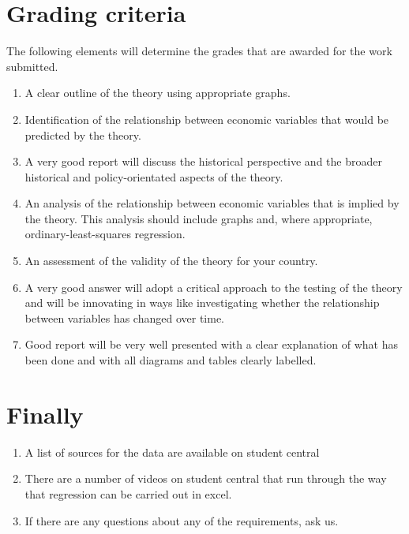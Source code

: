 \documentclass[12pt, a4paper, oneside]{article}\usepackage{graphicx, color}
\begin{document}
\section*{Grading criteria}
The following elements will determine the grades that are awarded for the work submitted. 

\begin{enumerate}
\item A clear outline of the theory using appropriate graphs.
\item Identification of the relationship between economic variables that would be predicted by the theory. 
\item A very good report will discuss the historical perspective and the broader historical and policy-orientated aspects of the theory.
\item An analysis of the relationship between economic variables that is implied by the theory. This analysis should include graphs and, where appropriate, ordinary-least-squares regression. 
\item An assessment of the validity of the theory for your country. 
\item A very good answer will adopt a critical approach to the testing of the theory and will be innovating in ways like investigating whether the relationship between variables has changed over time. 
\item Good report will be very well presented with a clear explanation of what has been done and with all diagrams and tables clearly labelled. 
\end{enumerate}

\section*{Finally}
\begin{enumerate}
\item A list of sources for the data are available on student central
\item There are a number of videos on student central that run through the way that regression can be carried out in excel. 
\item If there are any questions about any of the requirements, ask us. 
\end{enumerate}
\end{document}
